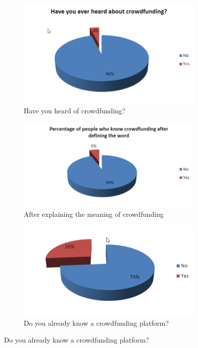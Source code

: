 \begin{center}
      
      \begin{figure}
            \begin{subfigure}{.4\textwidth}
         \centering
         \includegraphics[width=\textwidth]{assets/heardCrowd.png}
         \caption{ Have you heard of crowdfunding? }
         \label{fig:heardCrowd}
      \end{subfigure}%
      
      \begin{subfigure}{.4\textwidth}
            \centering
            \includegraphics[width=\textwidth]{assets/knowCrowd.png}
            \caption{After explaining the meaning of crowdfunding}
            \label{fig:knowCrowd}
      \end{subfigure}
      
      \begin{subfigure}{.4\textwidth}
            \centering
         \includegraphics[width=\textwidth]{assets/knowPlatform.png}
         \caption{Do you already know a crowdfunding platform?}
         \label{fig:knowPlatform}
      \end{subfigure}
      

\end{figure}
\end{center}
